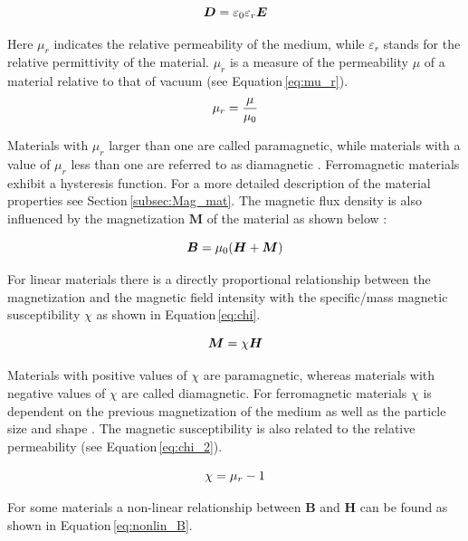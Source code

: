 \begin{equation}
\label{eq:D_tot}
\centering
\boldsymbol{D} = \varepsilon_{0}\varepsilon_{r}\boldsymbol{E}
\end{equation}

Here $\mu_{r}$ indicates the relative permeability of the medium, while $\varepsilon_{r}$ stands for the relative permittivity of the material. $\mu_{r}$ is a measure of the permeability $\mu$ of a material relative to that of vacuum (see Equation\,\ref{eq:mu_r}).
\begin{equation}
\label{eq:mu_r}
\centering
\mu_{r} = \frac{\mu}{\mu_{0}}
\end{equation}

 Materials with $\mu_{r}$ larger than one are called paramagnetic, while materials with a value of $\mu_{r}$ less than one are referred to as diamagnetic \cite{svoboda2004magnetic}. Ferromagnetic materials exhibit a hysteresis function. For a more detailed description of the material properties see Section\,\ref{subsec:Mag_mat}. The magnetic flux density is also influenced by the magnetization $\boldsymbol{M}$ of the material as shown below \cite{ichimura1989maxwell}: 

\begin{equation}
\label{eq:Mag}
\centering
\boldsymbol{B} = \mu_{0}(\boldsymbol{H} + \boldsymbol{M})
\end{equation}

For linear materials there is a directly proportional relationship between the magnetization and the magnetic field intensity with the specific/mass magnetic susceptibility $\chi$ as shown in Equation\,\ref{eq:chi}.  

\begin{equation}
\label{eq:chi}
\centering
\boldsymbol{M} = \chi\boldsymbol{H}
\end{equation}

Materials with positive values of $\chi$ are paramagnetic, whereas materials with negative values of $\chi$ are called diamagnetic. For ferromagnetic materials $\chi$ is dependent on the previous magnetization of the medium as well as the particle size and shape \cite{michalowsky2006magnettechnik}. The magnetic susceptibility is also related to the relative permeability (see Equation\,\ref{eq:chi_2}).

\begin{equation}
\label{eq:chi_2}
\centering
\chi = \mu_{r}-1
\end{equation}

For some materials a non-linear relationship between $\boldsymbol{B}$ and $\boldsymbol{H}$ can be found as shown in Equation\,\ref{eq:nonlin_B}.


